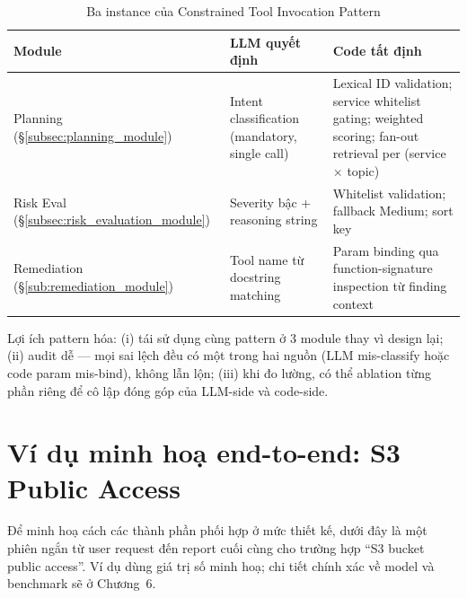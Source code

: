 \begin{table}[!htb]
  \centering
  \caption{Ba instance của Constrained Tool Invocation Pattern}
  \label{tab:constrained_tool_pattern}
  \footnotesize
  \begin{tabular}{|l|p{4.0cm}|p{4.0cm}|}
    \hline
    \textbf{Module} & \textbf{LLM quyết định} & \textbf{Code tất định} \\ \hline
    Planning (\S\ref{subsec:planning_module}) & Intent classification (mandatory, single call) & Lexical ID validation; service whitelist gating; weighted scoring; fan-out retrieval per (service $\times$ topic) \\ \hline
    Risk Eval (\S\ref{subsec:risk_evaluation_module}) & Severity bậc + reasoning string & Whitelist validation; fallback Medium; sort key \\ \hline
    Remediation (\S\ref{sub:remediation_module}) & Tool name từ docstring matching & Param binding qua function-signature inspection từ finding context \\ \hline
  \end{tabular}
\end{table}

Lợi ích pattern hóa: (i) tái sử dụng cùng pattern ở 3 module thay vì design lại; (ii) audit dễ — mọi sai lệch đều có một trong hai nguồn (LLM mis-classify hoặc code param mis-bind), không lẫn lộn; (iii) khi đo lường, có thể ablation từng phần riêng để cô lập đóng góp của LLM-side và code-side.

\section{Ví dụ minh hoạ end-to-end: S3 Public Access}
\label{sec:worked_example}

Để minh hoạ cách các thành phần phối hợp ở mức thiết kế, dưới đây là một phiên ngắn từ user request đến report cuối cùng cho trường hợp ``S3 bucket public access''. Ví dụ dùng giá trị số minh hoạ; chi tiết chính xác về model và benchmark sẽ ở Chương~6.

